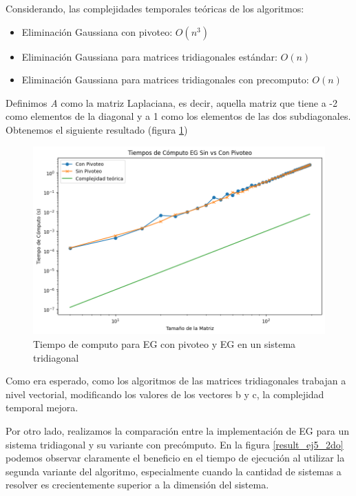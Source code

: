 Considerando, las complejidades temporales teóricas de los algoritmos:

\begin{itemize}
    \item Eliminación Gaussiana con pivoteo: $O(n^{3})$
    \item Eliminación Gaussiana para matrices tridiagonales estándar: $O(n)$
    \item Eliminación Gaussiana para matrices tridiagonales con precomputo: $O(n)$
\end{itemize}


Definimos \textit{A} como la matriz Laplaciana, es decir, aquella matriz que tiene a -2 como elementos de la diagonal y a 1 como los elementos de las dos subdiagonales. Obtenemos el siguiente resultado (figura \ref{result_ej5})

\begin{figure}[H]
\centerline{\includegraphics[scale=0.45]{./img/tiempos_EGsinVsConPivoteo.png}}
\caption{Tiempo de computo para EG con pivoteo y EG en un sistema tridiagonal}
\label{result_ej5}
\end{figure}

Como era esperado, como los algoritmos de las matrices tridiagonales trabajan a nivel vectorial, modificando los valores de los vectores b y c, la complejidad temporal mejora.

Por otro lado, realizamos la comparación entre la implementación de EG para un sistema tridiagonal y su variante con precómputo. En la figura \ref{result_ej5_2do} podemos observar claramente el beneficio en el tiempo de ejecución al utilizar la segunda variante del algoritmo, especialmente cuando la cantidad de sistemas a resolver es crecientemente superior a la dimensión del sistema.

